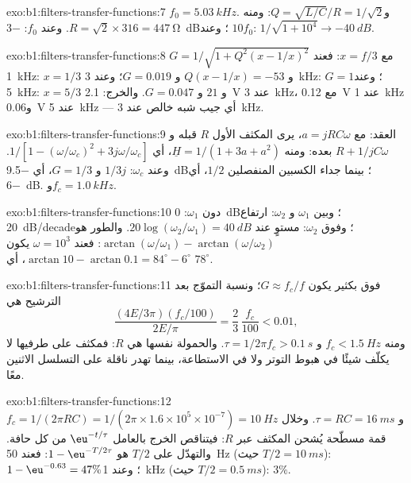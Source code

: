 \begin{solution}{exo:b1:filters-transfer-functions:7}
$f_0 = \qty{5.03}{kHz}$. و$Q = \sqrt{L/C}/R = 1/\sqrt2$: ومنه $R = \sqrt2 \times
316 = \qty{447}{\ohm}$. وعند $f_0$: \qty{-3}{dB}؛ وعند $10f_0$: $1/\sqrt{1 +
10^4} \to \qty{-40}{dB}$.
\end{solution}

\begin{solution}{exo:b1:filters-transfer-functions:8}
$G = 1/\sqrt{1 + Q^2(x - 1/x)^2}$ مع $x = f/3$: فعند \qty{1}{kHz}: $x = 1/3$ و
$Q(x - 1/x) = -53$ و $G = 0.019$؛ وعند \qty{3}{kHz}: $G = 1$؛ وعند \qty{5}{kHz}:
$x = 5/3$ و $21$ و $G = 0.047$. والخرج: \qty{2.1}{V} عند \qty{3}{kHz}، مع
\qty{0.12}{V} عند \qty{1}{kHz} و\qty{0.06}{V} عند \qty{5}{kHz} --- أي
جيب شبه خالص عند \qty{3}{kHz}.
\end{solution}

\begin{solution}{exo:b1:filters-transfer-functions:9}
العقد: مع $a = jRC\omega$، يرى المكثف الأول $R$ قبله و
$R + 1/jC\omega$ بعده: ومنه $\underline H = 1/(1 + 3a + a^2)$، أي
$1/[1 - (\omega/\omega_c)^2 + 3j\omega/\omega_c]$. وعند $\omega_c$: $1/3j$ و
$G = 1/3$، أي \qty{-9.5}{dB}؛ بينما جداء الكسبين المنفصلين
$1/2$، أي \qty{-6}{dB}. و$f_c = \qty{1.0}{kHz}$.
\end{solution}

\begin{solution}{exo:b1:filters-transfer-functions:10}
دون $\omega_1$: \qty{0}{dB}؛ وبين $\omega_1$ و $\omega_2$: ارتفاع
\qty{20}{dB/decade}؛ وفوق $\omega_2$: مستوٍ عند
$20\log(\omega_2/\omega_1) = \qty{40}{dB}$. والطور هو
$\arctan(\omega/\omega_1) - \arctan(\omega/\omega_2)$: فعند
$\omega = 10^3$ يكون $\arctan 10 - \arctan 0.1 = 84^\circ - 6^\circ$،
أي $78^\circ$.
\end{solution}

\begin{solution}{exo:b1:filters-transfer-functions:11}
فوق  بكثير يكون $G \approx f_c/f$؛ ونسبة التموّج بعد الترشيح
هي
\[
\frac{(4E/3\pi)(f_c/100)}{2E/\pi} = \frac{2}{3}\,\frac{f_c}{100} < 0.01,
\]
ومنه $f_c < \qty{1.5}{Hz}$ و $\tau = 1/2\pi f_c > \qty{0.1}{s}$. والحمولة نفسها هي
$R$: فمكثف على طرفيها لا يكلّف شيئًا في هبوط التوتر ولا في الاستطاعة،
بينما تهدر ناقلة على التسلسل الاثنين معًا.
\end{solution}

\begin{solution}{exo:b1:filters-transfer-functions:12}
$f_c = 1/(2\pi RC) = 1/(2\pi \times 1.6\times10^5 \times 10^{-7}) =
\qty{10}{Hz}$ و $\tau = RC = \qty{16}{ms}$. وخلال قمة مسطّحة يُشحن
المكثف عبر $R$: فيتناقص الخرج بالعامل $\eu^{-t/\tau}$
من كل حافة. والتهدّل على $T/2$ هو $1 - \eu^{-T/2\tau}$: فعند \qty{50}{Hz}
(حيث $T/2 = \qty{10}{ms}$): $1 - \eu^{-0.63} = 47\%$؛ وعند \qty{1}{kHz}
(حيث $T/2 = \qty{0.5}{ms}$): $3\%$.
\end{solution}

